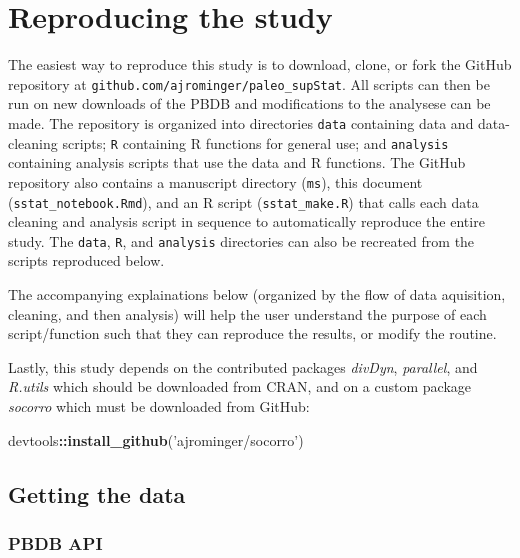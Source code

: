 \documentclass[]{article}
\title{}
\author{}
\date{}
\newenvironment{Shaded}{\begin{snugshade}}{\end{snugshade}}
\newcommand{\KeywordTok}[1]{\textcolor[rgb]{0.13,0.29,0.53}{\textbf{#1}}}
\newcommand{\StringTok}[1]{\textcolor[rgb]{0.31,0.60,0.02}{#1}}
\newcommand{\OperatorTok}[1]{\textcolor[rgb]{0.81,0.36,0.00}{\textbf{#1}}}
\newcommand{\NormalTok}[1]{#1}
\begin{document}
\section{Reproducing the study}\label{reproducing-the-study}

The easiest way to reproduce this study is to download, clone, or fork
the GitHub repository at \texttt{github.com/ajrominger/paleo\_supStat}.
All scripts can then be run on new downloads of the PBDB and
modifications to the analysese can be made. The repository is organized
into directories \texttt{data} containing data and data-cleaning
scripts; \texttt{R} containing R functions for general use; and
\texttt{analysis} containing analysis scripts that use the data and R
functions. The GitHub repository also contains a manuscript directory
(\texttt{ms}), this document (\texttt{sstat\_notebook.Rmd}), and an R
script (\texttt{sstat\_make.R}) that calls each data cleaning and
analysis script in sequence to automatically reproduce the entire study.
The \texttt{data}, \texttt{R}, and \texttt{analysis} directories can
also be recreated from the scripts reproduced below.

The accompanying explainations below (organized by the flow of data
aquisition, cleaning, and then analysis) will help the user understand
the purpose of each script/function such that they can reproduce the
results, or modify the routine.

Lastly, this study depends on the contributed packages \emph{divDyn},
\emph{parallel}, and \emph{R.utils} which should be downloaded from
CRAN, and on a custom package \emph{socorro} which must be downloaded
from GitHub:

\begin{Shaded}
\begin{Highlighting}[]
\NormalTok{devtools}\OperatorTok{::}\KeywordTok{install_github}\NormalTok{(}\StringTok{'ajrominger/socorro'}\NormalTok{)}
\end{Highlighting}
\end{Shaded}

\subsection{Getting the data}\label{getting-the-data}

\subsubsection{PBDB API}\label{pbdb-api}
\end{document}
